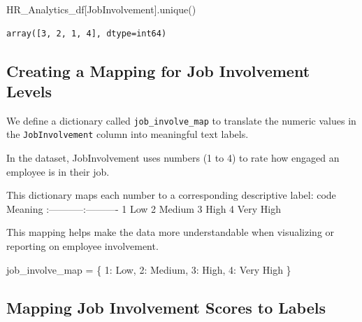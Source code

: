 \documentclass[
  letterpaper,
  DIV=11,
  numbers=noendperiod]{scrartcl}
\newenvironment{Shaded}{\begin{snugshade}}{\end{snugshade}}
\newcommand{\DecValTok}[1]{\textcolor[rgb]{0.68,0.00,0.00}{#1}}
\newcommand{\NormalTok}[1]{\textcolor[rgb]{0.00,0.23,0.31}{#1}}
\newcommand{\OperatorTok}[1]{\textcolor[rgb]{0.37,0.37,0.37}{#1}}
\newcommand{\StringTok}[1]{\textcolor[rgb]{0.13,0.47,0.30}{#1}}
\begin{document}
\begin{Shaded}
\begin{Highlighting}[]
\NormalTok{HR\_Analytics\_df[}\StringTok{\textquotesingle{}JobInvolvement\textquotesingle{}}\NormalTok{].unique()}
\end{Highlighting}
\end{Shaded}

\begin{verbatim}
array([3, 2, 1, 4], dtype=int64)
\end{verbatim}

\subsection{Creating a Mapping for Job Involvement
Levels}\label{creating-a-mapping-for-job-involvement-levels}

We define a dictionary called \texttt{job\_involve\_map} to translate
the numeric values in the \texttt{JobInvolvement} column into meaningful
text labels.

In the dataset, JobInvolvement uses numbers (1 to 4) to rate how engaged
an employee is in their job.

This dictionary maps each number to a corresponding descriptive label:
\textbar{} code \textbar{} Meaning \textbar{}
\textbar:-----------\textbar:----------\textbar{} \textbar{} 1
\textbar Low\textbar{} \textbar{} 2 \textbar{} Medium\textbar{}
\textbar{} 3 \textbar{} High\textbar{} \textbar{} 4 \textbar{} Very
High\textbar{}

This mapping helps make the data more understandable when visualizing or
reporting on employee involvement.

\begin{Shaded}
\begin{Highlighting}[]
\NormalTok{job\_involve\_map }\OperatorTok{=}\NormalTok{ \{}
    \DecValTok{1}\NormalTok{: }\StringTok{\textquotesingle{}Low\textquotesingle{}}\NormalTok{,}
    \DecValTok{2}\NormalTok{: }\StringTok{\textquotesingle{}Medium\textquotesingle{}}\NormalTok{,}
    \DecValTok{3}\NormalTok{: }\StringTok{\textquotesingle{}High\textquotesingle{}}\NormalTok{,}
    \DecValTok{4}\NormalTok{: }\StringTok{\textquotesingle{}Very High\textquotesingle{}}
\NormalTok{\}}
\end{Highlighting}
\end{Shaded}

\subsection{Mapping Job Involvement Scores to
Labels}\label{mapping-job-involvement-scores-to-labels}
\end{document}
